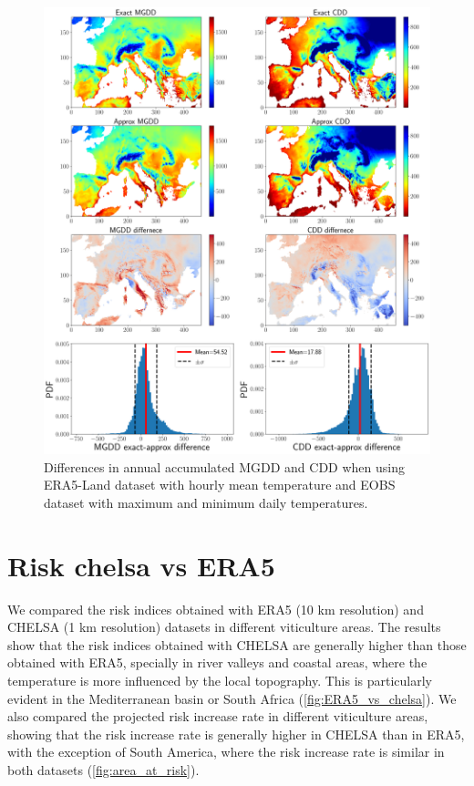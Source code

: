 \begin{figure}[H]
    \centering
    \includegraphics[width=\textwidth]{Figures/E-OBS_vs_ERA5.pdf}
    \caption{Differences in annual accumulated MGDD and CDD when using
        ERA5-Land dataset with hourly mean temperature and EOBS dataset with
        maximum
        and minimum daily temperatures.}
    \label{fig:EOBS_vs_ERA5}
\end{figure}

\newpage
\section{Risk chelsa vs ERA5}

We compared the risk indices obtained with ERA5 (10 km resolution) and CHELSA
(1 km resolution) datasets in different viticulture areas. The results show
that the risk indices obtained with CHELSA are generally higher than those
obtained with ERA5, specially in river valleys and coastal areas, where the
temperature is more influenced by the local topography. This is particularly
evident in the Mediterranean basin or South Africa (\cref{fig:ERA5_vs_chelsa}).
We also compared the projected risk increase rate in different viticulture
areas, showing that the risk increase rate is generally higher in CHELSA than
in ERA5, with the exception of South America, where the risk increase rate is
similar in both datasets (\cref{fig:area_at_risk}).

